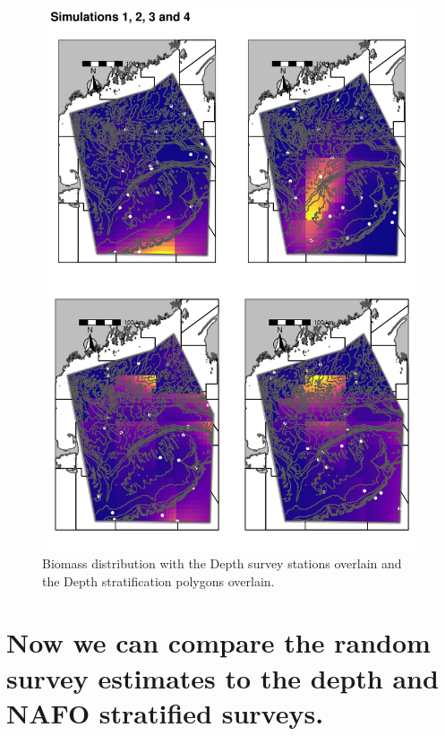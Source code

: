 \documentclass[
]{article}
\begin{document}
\begin{figure}
\centering
\includegraphics{Survey_tutortial_files/figure-latex/depth-samp-plt-1.pdf}
\caption{\label{fig:depth-samp-plt}Biomass distribution with the Depth survey stations overlain and the Depth stratification polygons overlain.}
\end{figure}

\hypertarget{now-we-can-compare-the-random-survey-estimates-to-the-depth-and-nafo-stratified-surveys.}{%
\section{Now we can compare the random survey estimates to the depth and NAFO stratified surveys.}\label{now-we-can-compare-the-random-survey-estimates-to-the-depth-and-nafo-stratified-surveys.}}
\end{document}
